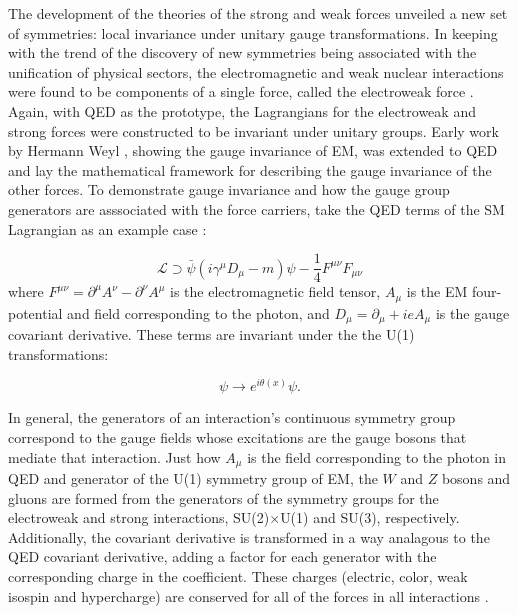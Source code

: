 \indent The development of the theories of the strong and weak forces unveiled a new set of symmetries: local invariance under unitary gauge transformations. In keeping with the trend of the discovery of new symmetries being associated with the unification of physical sectors, the electromagnetic and weak nuclear interactions were found to be components of a single force, called the electroweak force \cite{Glashow:1961tr, PhysRevLett.19.1264}. Again, with QED as the prototype, the Lagrangians for the electroweak and strong forces were constructed to be invariant under unitary groups. Early work by Hermann Weyl \cite{Weyl:1927vd}, showing the gauge invariance of EM, was extended to QED and lay the mathematical framework for describing the gauge invariance of the other forces. To demonstrate gauge invariance and how the gauge group generators are asssociated with the force carriers, take the QED terms of the SM Lagrangian as an example case \cite{peskinschroeder}:

\begin{equation}
\mathcal{L} \supset \bar{\psi} ( i \gamma^\mu D_\mu - m ) \psi - \frac{1}{4} F^{\mu\nu}F_{\mu\nu}
\end{equation}
where $F^{\mu\nu} = \partial^\mu A ^\nu - \partial^\nu A^\mu$ is the electromagnetic field tensor, $A_\mu$ is the EM four-potential and field corresponding to the photon, and $D_\mu = \partial_\mu + i e A_\mu$ is the gauge covariant derivative. These terms are invariant under the the U(1) transformations:

\begin{equation}
\psi \rightarrow e^{i\theta(x)} \psi.
\end{equation}

In general, the generators of an interaction's continuous symmetry group correspond to the gauge fields whose excitations are the gauge bosons that mediate that interaction. Just how $A_\mu$ is the field corresponding to the photon in QED and generator of the U(1) symmetry group of EM, the $W$ and $Z$ bosons and gluons are formed from the generators of the symmetry groups for the electroweak and strong interactions, SU(2)$\times$U(1) and SU(3), respectively. Additionally, the covariant derivative is transformed in a way analagous to the QED covariant derivative, adding a factor for each generator with the corresponding charge in the coefficient. These charges (electric, color, weak isospin and hypercharge) are conserved for all of the forces in all interactions \cite{Bettini}.

